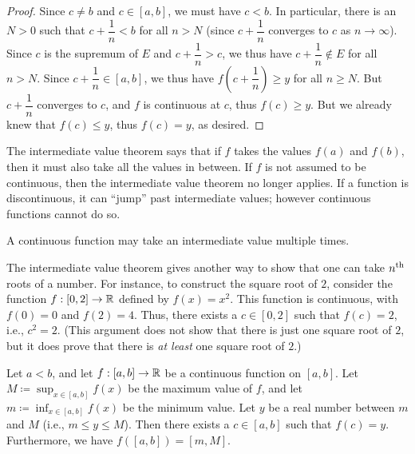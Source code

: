 \begin{proof}
  Since \(c \neq b\) and \(c \in [a, b]\), we must have \(c < b\).
  In particular, there is an \(N > 0\) such that \(c + \dfrac{1}{n} < b\) for all \(n > N\)
  (since \(c + \dfrac{1}{n}\) converges to \(c\) as \(n \to \infty\)).
  Since \(c\) is the supremum of \(E\) and \(c + \dfrac{1}{n} > c\), we thus have \(c + \dfrac{1}{n} \notin E\) for all \(n > N\).
  Since \(c + \dfrac{1}{n} \in [a, b]\), we thus have \(f(c + \dfrac{1}{n}) \geq y\) for all \(n \geq N\).
  But \(c + \dfrac{1}{n}\) converges to \(c\), and \(f\) is continuous at \(c\), thus \(f(c) \geq y\).
  But we already knew that \(f(c) \leq y\), thus \(f(c) = y\), as desired.
\end{proof}

\begin{note}
  The intermediate value theorem says that if \(f\) takes the values \(f(a)\) and \(f(b)\), then it must also take all the values in between.
  If \(f\) is not assumed to be continuous, then the intermediate value theorem no longer applies.
  If a function is discontinuous, it can ``jump'' past intermediate values;
  however continuous functions cannot do so.
\end{note}

\begin{rmk}\label{i:9.7.2}
  A continuous function may take an intermediate value multiple times.
\end{rmk}

\begin{rmk}\label{i:9.7.3}
  The intermediate value theorem gives another way to show that one can take \(n^{\operatorname{th}}\) roots of a number.
  For instance, to construct the square root of \(2\), consider the function \(f : [0, 2] \to \mathbb{R}\) defined by \(f(x) = x^2\).
  This function is continuous, with \(f(0) = 0\) and \(f(2) = 4\).
  Thus, there exists a \(c \in [0, 2]\) such that \(f(c) = 2\), i.e., \(c^2 = 2\).
  (This argument does not show that there is just one square root of \(2\), but it does prove that there is \emph{at least} one square root of \(2\).)
\end{rmk}

\begin{cor}\label{i:9.7.4}
  Let \(a < b\), and let \(f : [a, b] \to \mathbb{R}\) be a continuous function on \([a, b]\).
  Let \(M \coloneqq \sup_{x \in [a, b]} f(x)\) be the maximum value of \(f\), and let \(m \coloneqq \inf_{x \in [a, b]} f(x)\) be the minimum value.
  Let \(y\) be a real number between \(m\) and \(M\) (i.e., \(m \leq y \leq M\)).
  Then there exists a \(c \in [a, b]\) such that \(f(c) = y\).
  Furthermore, we have \(f([a, b]) = [m, M]\).
\end{cor}

